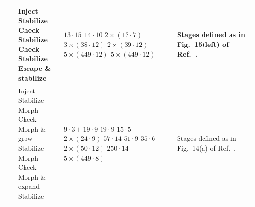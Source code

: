 \documentclass[%
    aps, 
    physrev,
    reprint,
]{revtex4-2}
\begin{document}
\begin{table}
\begin{tabular}{|c|l|l|l|}
   ~\cite{gidney2024magic} & 
    \makecell[l]{Inject \\
                Stabilize \\
                Check \\
                Stabilize \\
                Check \\
                Stabilize \\
                Escape \& stabilize
                } &
    \makecell[l]{$13\cdot 15$ \\
                $14\cdot 10$ \\
                $2\times(13\cdot 7)$ \\
                $3\times (38 \cdot 12)$ \\
                $2\times(39\cdot 12)$ \\
                $5\times (449\cdot12)$ \\
                $5\times (449\cdot12)$
                } &
    Stages defined as in Fig.~15(left) of Ref.~\cite{gidney2024magic}.\\ \hline       
    
   ~\cite{chen2025efficient} & 
    \makecell[l]{Inject \\
                Stabilize \\
                Morph \\
                Check \\
                Morph \& grow \\
                Stabilize \\
                Morph \\
                Check \\
                Morph \& expand \\
                Stabilize
                } &
    \makecell[l]{$9\cdot 3 + 19 \cdot 9$ \\
                $19\cdot 9$ \\
                $15\cdot 5$ \\
                $2\times (24 \cdot 9)$ \\
                $57 \cdot 14$ \\
                $51 \cdot 9$ \\
                $35 \cdot 6$ \\
                $2\times (50 \cdot 12)$ \\
                $250 \cdot 14$ \\
                $5 \times (449 \cdot 8)$
                } &
    Stages defined as in Fig.~14(a) of Ref.~\cite{chen2025efficient}.\\ \hline  
    

\end{tabular}
\end{table}
\end{document}
